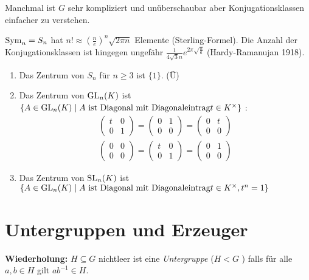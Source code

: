 Manchmal ist $G$ sehr kompliziert und unüberschaubar aber Konjugationsklassen einfacher zu verstehen.

\begin{eg}
	$\operatorname{Sym}_{n} = S_{n}$ hat $n! \approx \left( \frac{n}{e} \right)^{n} \sqrt{2\pi n} $ Elemente (Sterling-Formel).
	Die Anzahl der Konjugationsklassen ist hingegen ungefähr $\frac{1}{4 \sqrt{3} n} e^{2\pi \sqrt{\frac{n}{6}}}$ (Hardy-Ramanujan 1918).
\end{eg}

\begin{eg}
	\begin{enumerate}[1)]
		\item Das Zentrum von $S_{n}$ für $n \geq 3$ ist $\{1\}$. (Ü)
		\item Das Zentrum von $\operatorname{GL}_{n}(K)$ ist $\{A \in \operatorname{GL}_{n}(K) \mid  A \text{ ist Diagonal mit Diagonaleintrag} t \in K^{\times}\}$ :
			\begin{align*}
			\begin{pmatrix} 
				t &0\\ 0 &1
			\end{pmatrix} = \begin{pmatrix} 
				0 &1\\ 0&0
			\end{pmatrix} = \begin{pmatrix} 
				0 &t\\ 0 & 0
			\end{pmatrix} \\
			\begin{pmatrix} 
				0 &0\\ 0 & 0
			\end{pmatrix} = \begin{pmatrix} 
				t &0\\ 0 &1
			\end{pmatrix} = \begin{pmatrix} 
				0 &1\\ 0 &0
			\end{pmatrix} 
			\end{align*}
		\item Das Zentrum von $\operatorname{SL}_{n}(K)$ ist $\{A \in \operatorname{GL}_{n}(K) \mid  A \text{ ist Diagonal mit Diagonaleintrag} t \in K^{\times}, t^{n} = 1\}$
	\end{enumerate}
\end{eg}

\section{Untergruppen und Erzeuger}
\textbf{Wiederholung:}
$H\subseteq G$ nichtleer ist eine \emph{Untergruppe} ($H<G$ ) falls für alle $a,b \in H$ gilt $ab^{-1} \in H$.

